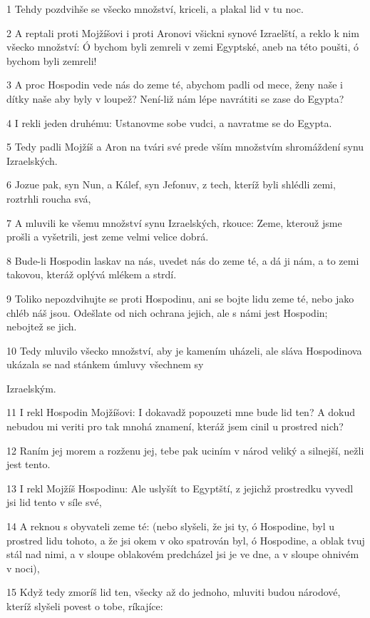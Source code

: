 \par 1 Tehdy pozdvihše se všecko množství, kriceli, a plakal lid v tu noc.
\par 2 A reptali proti Mojžíšovi i proti Aronovi všickni synové Izraelští, a reklo k nim všecko množství: Ó bychom byli zemreli v zemi Egyptské, aneb na této poušti, ó bychom byli zemreli!
\par 3 A proc Hospodin vede nás do zeme té, abychom padli od mece, ženy naše i dítky naše aby byly v loupež? Není-liž nám lépe navrátiti se zase do Egypta?
\par 4 I rekli jeden druhému: Ustanovme sobe vudci, a navratme se do Egypta.
\par 5 Tedy padli Mojžíš a Aron na tvári své prede vším množstvím shromáždení synu Izraelských.
\par 6 Jozue pak, syn Nun, a Kálef, syn Jefonuv, z tech, kteríž byli shlédli zemi, roztrhli roucha svá,
\par 7 A mluvili ke všemu množství synu Izraelských, rkouce: Zeme, kterouž jsme prošli a vyšetrili, jest zeme velmi velice dobrá.
\par 8 Bude-li Hospodin laskav na nás, uvedet nás do zeme té, a dá ji nám, a to zemi takovou, kteráž oplývá mlékem a strdí.
\par 9 Toliko nepozdvihujte se proti Hospodinu, ani se bojte lidu zeme té, nebo jako chléb náš jsou. Odešlate od nich ochrana jejich, ale s námi jest Hospodin; nebojtež se jich.
\par 10 Tedy mluvilo všecko množství, aby je kamením uházeli, ale sláva Hospodinova ukázala se nad stánkem úmluvy všechnem sy\par Izraelským.
\par 11 I rekl Hospodin Mojžíšovi: I dokavadž popouzeti mne bude lid ten? A dokud nebudou mi veriti pro tak mnohá znamení, kteráž jsem cinil u prostred nich?
\par 12 Raním jej morem a rozženu jej, tebe pak uciním v národ veliký a silnejší, nežli jest tento.
\par 13 I rekl Mojžíš Hospodinu: Ale uslyšít to Egyptští, z jejichž prostredku vyvedl jsi lid tento v síle své,
\par 14 A reknou s obyvateli zeme té: (nebo slyšeli, že jsi ty, ó Hospodine, byl u prostred lidu tohoto, a že jsi okem v oko spatrován byl, ó Hospodine, a oblak tvuj stál nad nimi, a v sloupe oblakovém predcházel jsi je ve dne, a v sloupe ohnivém v noci),
\par 15 Když tedy zmoríš lid ten, všecky až do jednoho, mluviti budou národové, kteríž slyšeli povest o tobe, ríkajíce:
